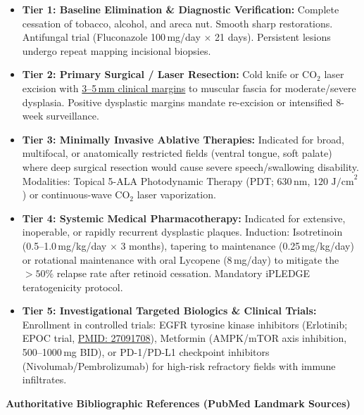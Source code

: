 \documentclass[9pt,a4paper]{article}
\begin{document}
\begin{itemize}
    \item \textbf{Tier 1: Baseline Elimination \& Diagnostic Verification:} Complete cessation of tobacco, alcohol, and areca nut. Smooth sharp restorations. Antifungal trial (Fluconazole 100\,mg/day $\times$ 21 days). Persistent lesions undergo repeat mapping incisional biopsies.
    \item \textbf{Tier 2: Primary Surgical / Laser Resection:} Cold knife or $\text{CO}_2$ laser excision with \underline{3--5\,mm clinical margins} to muscular fascia for moderate/severe dysplasia. Positive dysplastic margins mandate re-excision or intensified 8-week surveillance.
    \item \textbf{Tier 3: Minimally Invasive Ablative Therapies:} Indicated for broad, multifocal, or anatomically restricted fields (ventral tongue, soft palate) where deep surgical resection would cause severe speech/swallowing disability. Modalities: Topical 5-ALA Photodynamic Therapy (PDT; 630\,nm, $120\text{ J/cm}^2$) or continuous-wave $\text{CO}_2$ laser vaporization.
    \item \textbf{Tier 4: Systemic Medical Pharmacotherapy:} Indicated for extensive, inoperable, or rapidly recurrent dysplastic plaques. Induction: Isotretinoin (0.5--1.0\,mg/kg/day $\times$ 3 months), tapering to maintenance (0.25\,mg/kg/day) or rotational maintenance with oral Lycopene (8\,mg/day) to mitigate the $>50\%$ relapse rate after retinoid cessation. Mandatory iPLEDGE teratogenicity protocol.
    \item \textbf{Tier 5: Investigational Targeted Biologics \& Clinical Trials:} Enrollment in controlled trials: EGFR tyrosine kinase inhibitors (Erlotinib; EPOC trial, \href{https://pubmed.ncbi.nlm.nih.gov/27091708/}{PMID: 27091708}), Metformin (AMPK/mTOR axis inhibition, 500--1000\,mg BID), or PD-1/PD-L1 checkpoint inhibitors (Nivolumab/Pembrolizumab) for high-risk refractory fields with immune infiltrates.
\end{itemize}

\vspace{5pt}
{\large\bfseries Authoritative Bibliographic References (PubMed Landmark Sources)}
\vspace{2pt}
\end{document}
